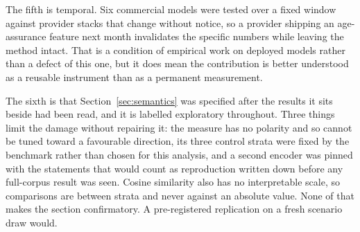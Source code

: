 The fifth is temporal. Six commercial models were tested over a fixed window
against provider stacks that change without notice, so a provider shipping an
age-assurance feature next month invalidates the specific numbers while leaving
the method intact. That is a condition of empirical work on deployed models
rather than a defect of this one, but it does mean the contribution is better
understood as a reusable instrument than as a permanent measurement.

The sixth is that Section~\ref{sec:semantics} was specified after the results it
sits beside had been read, and it is labelled exploratory throughout. Three
things limit the damage without repairing it: the measure has no polarity and so
cannot be tuned toward a favourable direction, its three control strata were
fixed by the benchmark rather than chosen for this analysis, and a second
encoder was pinned with the statements that would count as reproduction written
down before any full-corpus result was seen. Cosine similarity also has no
interpretable scale, so comparisons are between strata and never against an
absolute value. None of that makes the section confirmatory. A pre-registered
replication on a fresh scenario draw would.